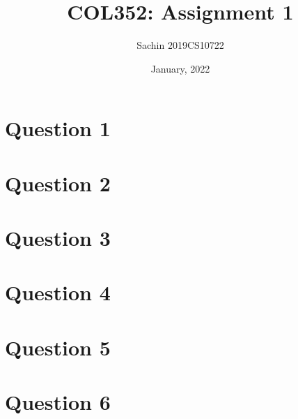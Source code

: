 \documentclass{article}
\title{COL352: Assignment 1}
\author{Sachin 2019CS10722 }
\date{January, 2022}
\begin{document}
\maketitle

\section{Question 1}





\section{Question 2}




\section{Question 3}






\section{Question 4}





\section{Question 5}






\section{Question 6}
\end{document}
